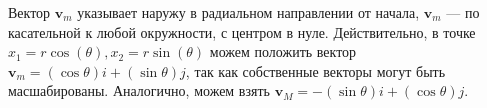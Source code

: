 \documentclass[a4paper, 12pt]{article}
\begin{document}
Вектор $\textbf{v}_m$ указывает наружу в радиальном направлении от начала,
$\textbf{v}_m$ --- по касательной к любой окружности, с центром в нуле. Действительно,
в точке $x_1 = r\cos(\theta), x_2 = r\sin(\theta)$ можем положить вектор 
$\textbf{v}_m = (\cos\theta)i+(\sin\theta)j$, так как собственные векторы могут быть
масшабированы. Аналогично, можем взять $\textbf{v}_M = -(\sin\theta)i+(\cos\theta)j$.
\end{document}
